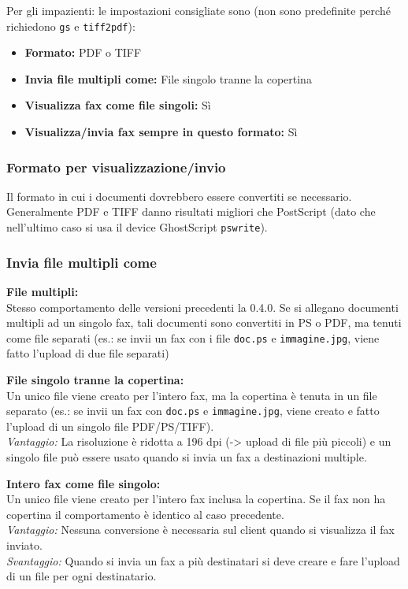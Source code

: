 \documentclass[a4paper,10pt]{scrartcl}
\begin{document}
Per gli impazienti: le impostazioni consigliate sono (non sono predefinite perché richiedono \texttt{gs} e \texttt{tiff2pdf}):
\begin{itemize}
 \item \textbf{Formato:} PDF o TIFF
 \item \textbf{Invia file multipli come:} File singolo tranne la copertina
 \item \textbf{Visualizza fax come file singoli:} Sì
 \item \textbf{Visualizza/invia fax sempre in questo formato:} Sì
\end{itemize}

\subsubsection{Formato per visualizzazione/invio}

Il formato in cui i documenti dovrebbero essere convertiti se necessario. Generalmente PDF e TIFF danno risultati migliori che PostScript (dato che nell'ultimo caso si usa il device GhostScript \texttt{pswrite}).

\subsubsection{Invia file multipli come}

{\parindent0pt
\textbf{File multipli:}\\
Stesso comportamento delle versioni precedenti la 0.4.0. Se si allegano documenti multipli ad un singolo fax, tali documenti sono convertiti in PS o PDF, ma tenuti come file separati (es.: se invii un fax con i file \texttt{doc.ps} e \texttt{immagine.jpg}, viene fatto l'upload di due file separati)
\medskip

\textbf{File singolo tranne la copertina:}\\
Un unico file viene creato per l'intero fax, ma la copertina è tenuta in un file separato (es.: se invii un fax con \texttt{doc.ps} e \texttt{immagine.jpg}, viene creato e fatto l'upload di un singolo file PDF/PS/TIFF).\\
\textit{Vantaggio:} La risoluzione è ridotta a 196 dpi (-> upload di file più piccoli) e un singolo file può essere usato quando si invia un fax a destinazioni multiple.
\medskip

\textbf{Intero fax come file singolo:}\\
Un unico file viene creato per l'intero fax inclusa la copertina. Se il fax non ha copertina il comportamento è identico al caso precedente.\\
\textit{Vantaggio:} Nessuna conversione è necessaria sul client quando si visualizza il fax inviato.\\
\textit{Svantaggio:} Quando si invia un fax a più destinatari si deve creare e fare l'upload di un file per ogni destinatario.
}
\end{document}
